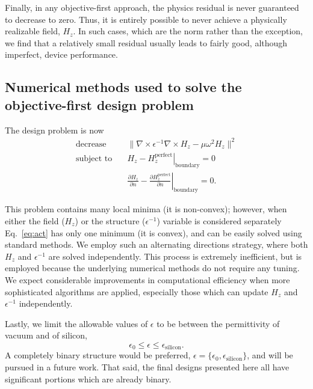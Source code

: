 \documentclass[letterpaper,10pt]{article}
\begin{document}
Finally, in any objective-first approach,
    the physics residual is never guaranteed to decrease to zero.
Thus, it is entirely possible to never achieve 
    a physically realizable field, $H_z$.
In such cases, which are the norm rather than the exception,
    we find that a relatively small residual usually leads to
    fairly good, although imperfect, device performance.
    
\subsection{Numerical methods used to solve the objective-first design problem}
The design problem is now
    \begin{subequations}\label{eq:act}
    \begin{align} 
    \text{decrease} & \quad  
        \| \nabla \times \epsilon^{-1} \nabla \times H_z - \mu \omega^2 H_z \|^2
        \label{eq:act:obj} \\ 
    \text{subject to} & \quad 
        \left. H_z - H_z^\text{perfect} \right| _\text{boundary} = 0 
        \label{eq:act:con1} \\
        & \quad 
        \left. \frac{\partial H_z}{\partial n} - 
        \frac{\partial H_z^\text{perfect}}{\partial n} \right|_\text{boundary}
            = 0. \label{eq:act:con2}
    \end{align}
    \end{subequations}

This problem contains many local minima (it is non-convex\cite{});
    however, when either the field ($H_z$) or the structure ($\epsilon^{-1}$)
    variable is considered separately Eq.~\ref{eq:act} has only one minimum
    (it is convex), and can be easily solved using standard methods.
We employ such an alternating directions strategy,
    where both $H_z$ and $\epsilon^{-1}$ are solved independently.
This process is extremely inefficient,
    but is employed because the underlying numerical methods
    do not require any tuning.
We expect considerable improvements in computational efficiency
    when more sophisticated algorithms are applied,
    especially those which can update $H_z$ and $\epsilon^{-1}$ independently.
    
Lastly, we limit the allowable values of $\epsilon$ to be between
    the permittivity of vacuum and of silicon,
    \begin{equation}
    \epsilon_0 \le \epsilon \le \epsilon_\text{silicon}.
    \end{equation}
A completely binary structure would be preferred,
    $\epsilon = \{\epsilon_0, \epsilon_\text{silicon}\}$,
    and will be pursued in a future work.
That said, the final designs presented here 
    all have significant portions which are already binary.
\end{document}
